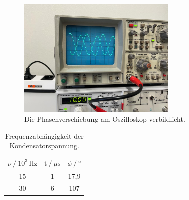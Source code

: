 \begin{figure}[H]
    \centering
    \includegraphics[width=76mm]{bilder/Ab12.jpeg}
    \caption{Die Phasenverschiebung am Oszilloskop verbildlicht.\label{Abbildung12}}
\end{figure}

\begin{table}[H]
    \centering
    \caption{Frequenzabhängigkeit der Kondensatorspannung.}
    \label{Tabelle3}
    \begin{tabular} {c  c  c}
        \toprule
        {$ \nu \mathbin{/} 10^{3}\,\unit{\hertz} $} &
        {$ \text{t} \mathbin{/} \mu \unit{\second}$}  &
        {$ \phi \mathbin{/} \unit{\degree} $}\\
        \midrule
        15 & 1 & 17,9  \\
        30 & 6 & 107   \\
    \end{tabular} 
\end{table}



